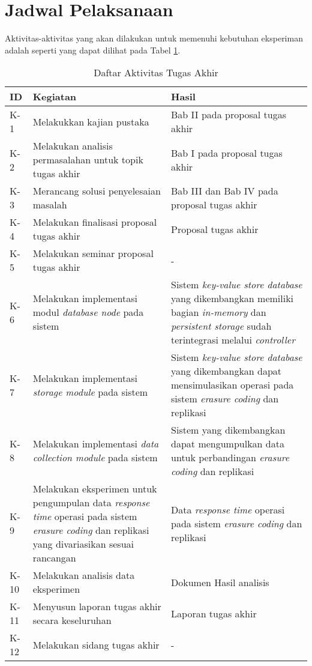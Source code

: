 \section{Jadwal Pelaksanaan}
\label{sec:jadwal-pelaksanaan}
Aktivitas-aktivitas yang akan dilakukan untuk memenuhi kebutuhan eksperiman adalah seperti yang dapat dilihat pada Tabel \ref{tab:rincian-aktivitas}.

\begin{longtable}{|p{1cm}|p{6cm}|p{6cm}|}
\caption{Daftar Aktivitas Tugas Akhir} 
\label{tab:rincian-aktivitas} \\
\hline
\rowcolor{black!10} ID & Kegiatan & Hasil \\ \hline
K-1  & Melakukkan kajian pustaka & Bab II pada proposal tugas akhir \\ \hline
K-2  & Melakukan analisis permasalahan untuk topik tugas akhir & Bab I pada proposal tugas akhir \\ \hline
K-3  & Merancang solusi penyelesaian masalah & Bab III dan Bab IV pada proposal tugas akhir \\ \hline
K-4  & Melakukan finalisasi proposal tugas akhir & Proposal tugas akhir \\ \hline
K-5  & Melakukan seminar proposal tugas akhir & - \\ \hline
K-6  & Melakukan implementasi modul \textit{database node} pada sistem & Sistem \textit{key-value store database} yang dikembangkan memiliki bagian \textit{in-memory} dan \textit{persistent storage} sudah terintegrasi melalui \textit{controller} \\ \hline
K-7  & Melakukan implementasi \textit{storage module} pada sistem & Sistem \textit{key-value store database} yang dikembangkan dapat mensimulasikan operasi pada sistem \textit{erasure coding} dan replikasi \\ \hline
K-8  & Melakukan implementasi \textit{data collection module} pada sistem & Sistem yang dikembangkan dapat mengumpulkan data untuk perbandingan \textit{erasure coding} dan replikasi \\ \hline
K-9  & Melakukan eksperimen untuk pengumpulan data \textit{response time} operasi pada sistem \textit{erasure coding} dan replikasi yang divariasikan sesuai rancangan & Data \textit{response time} operasi pada sistem \textit{erasure coding} dan replikasi \\ \hline
K-10  & Melakukan analisis data eksperimen & Dokumen Hasil analisis \\ \hline
K-11  & Menyusun laporan tugas akhir secara keseluruhan & Laporan tugas akhir \\ \hline
K-12  & Melakukan sidang tugas akhir & - \\ \hline 
\end{longtable}

